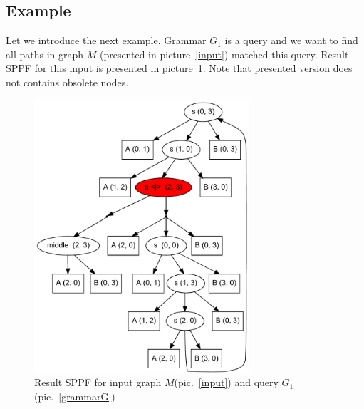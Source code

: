 \subsection{Example}

Let we introduce the next example. Grammar $G_1$ is a query and we want to find all paths in graph $M$ (presented in picture~\ref{input}) matched this query.
Result SPPF for this input is presented in picture~\ref{SPPF}. Note that presented version does not contains obsolete nodes.

\begin{figure}[h]
    \begin{center}
        \includegraphics[width=8cm]{dot/AnBn.pdf}
        \caption{Result SPPF for input graph $M$(pic.~\ref{input}) and query $G_1$(pic.~\ref{grammarG})}
        \label{SPPF}        
    \end{center}
\end{figure}


